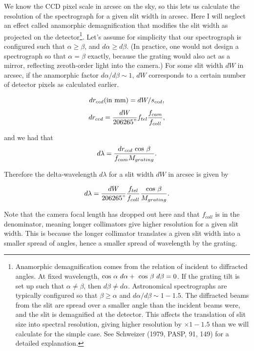 \documentclass[12pt]{article}
\begin{document}
We know the CCD pixel scale in arcsec on the sky, so this lets
us calculate the resolution of the spectrograph for a given
slit width in arcsec.  Here I will neglect an effect called 
anamorphic demagnification that modifies the slit width as
projected on the detector\footnote{
Anamorphic demagnification
comes from the relation of incident to diffracted angles.
At fixed wavelength, 
${\rm cos}~\alpha~d\alpha +\ {\rm cos}~\beta~d\beta =0$.
If the grating tilt is set up such that $\alpha \neq \beta$,
then $d\beta \neq d\alpha$.  Astronomical spectrographs
are typically configured so that $\beta \geq \alpha$ and
$d\alpha/d\beta \sim 1-1.5$.  The diffracted beams from the 
slit are spread over a smaller angle than the incident beams were, and the
slit is demagnified at the detector.  This affects the translation 
of slit size into spectral resolution, giving higher resolution 
by $\times 1-1.5$ than we will calculate for the simple case.  See
Schweizer (1979, PASP, 91, 149) for a detailed explanation.}.
Let's assume for simplicity
that our spectrograph is configured such that $\alpha \geq \beta$,
and $d\alpha \geq d\beta$.  (In practice, one would not design
a spectrograph so that $\alpha=\beta$ exactly, because the grating would
also act as a mirror, reflecting zeroth-order light into the camera.)
For some slit width $dW$ in arcsec, if the anamorphic factor 
$d\alpha/d\beta \sim 1$, $dW$ corresponds to a certain number 
of detector pixels as calculated earlier.

$$ dr_{ccd} {\rm (in\ mm)} = dW / s_{ccd} , $$
$$ dr_{ccd} = \frac{dW}{206265"} f_{tel} \frac{f_{cam}}{f_{coll}}, $$

and we had that
$$ d\lambda = \frac{dr_{ccd}~{\rm cos}~\beta}{f_{cam} M_{grating}}. $$

Therefore the delta-wavelength $d\lambda$ for a slit width $dW$
in arcsec is given by

%

$$  d\lambda = \frac{dW}{206265"} \frac{f_{tel}}{f_{coll}}\frac{{\rm cos}~\beta}{M_{grating}}. $$

Note that the camera focal length has dropped out here and
that $f_{coll}$ is in the denominator, meaning longer collimators
give higher resolution for a given slit width.  This is 
because the longer collimator translates a given slit width
into a smaller spread of angles, hence a smaller spread of
wavelength by the grating.
\end{document}
